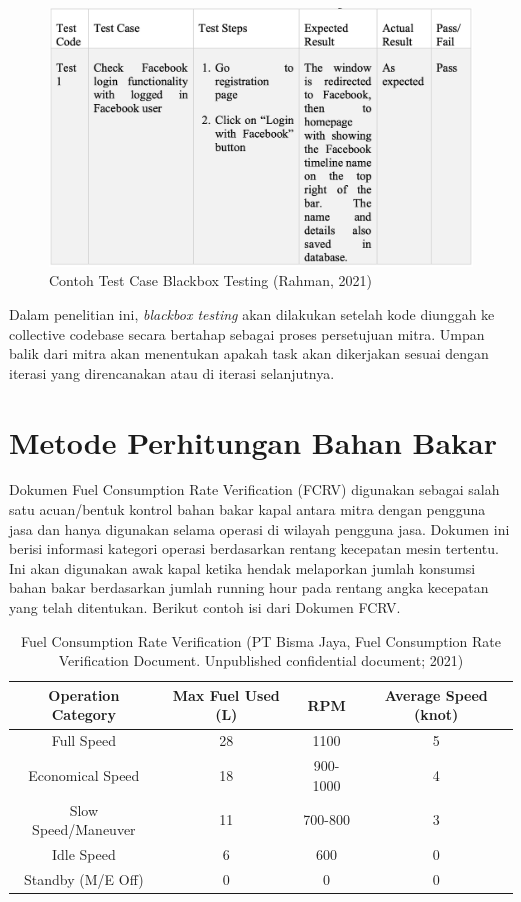 \begin{figure}[!h]
    \includegraphics[width=.8\linewidth, center]{images/tinjauan-pustaka/fig-blackbox-eg.png}
    \caption{Contoh Test Case Blackbox Testing (Rahman, 2021)}
    \label{fig:blackbox-example}
\end{figure}

Dalam penelitian ini, \textit{blackbox testing} akan dilakukan setelah kode diunggah ke collective codebase secara bertahap sebagai proses persetujuan mitra. Umpan balik dari mitra akan menentukan apakah task akan dikerjakan sesuai dengan iterasi yang direncanakan atau di iterasi selanjutnya.

\section{Metode Perhitungan Bahan Bakar}

Dokumen Fuel Consumption Rate Verification (FCRV) digunakan sebagai salah satu acuan/bentuk kontrol bahan bakar kapal antara mitra dengan pengguna jasa dan hanya digunakan selama operasi di wilayah pengguna jasa. Dokumen ini berisi informasi kategori operasi berdasarkan rentang kecepatan mesin tertentu. Ini akan digunakan awak kapal ketika hendak melaporkan jumlah konsumsi bahan bakar berdasarkan jumlah running hour pada rentang angka kecepatan yang telah ditentukan. Berikut contoh isi dari Dokumen FCRV.

\newpage

\begin{table}[!h]
    \caption{ Fuel Consumption Rate Verification (PT Bisma Jaya, Fuel Consumption Rate Verification Document. Unpublished confidential document; 2021)}
    \centering
     \begin{tabular}{c c c c}
        \toprule
        Operation Category &
        Max Fuel Used (L) &
        RPM &
        Average Speed (knot) \\ [0.5ex]
        \midrule
        Full Speed          & 28    & 1100      & 5 \\
        Economical Speed    & 18    & 900-1000  & 4 \\
        Slow Speed/Maneuver & 11    & 700-800   & 3 \\
        Idle Speed          & 6     & 600       & 0 \\
        Standby (M/E Off)   & 0     & 0         & 0 \\ [1ex]
        \bottomrule
    \end{tabular}
     \label{tab:fcrv}
\end{table}

